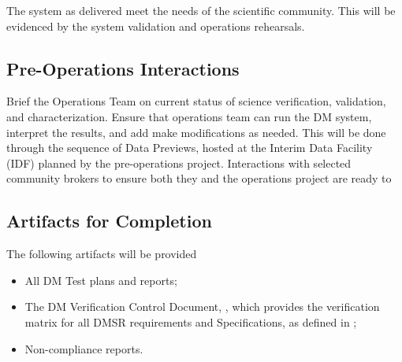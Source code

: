 The system as delivered meet the needs of the scientific community. 
This will be evidenced by the system validation and operations rehearsals. 

\subsection{Pre-Operations Interactions}

Brief the Operations Team on current status of science verification, validation, and characterization.
Ensure that operations team can run the DM system, interpret the results, and add make modifications as needed. 
This will be done through the sequence of Data Previews,  hosted at the Interim Data Facility (IDF) planned by the pre-operations project. 
Interactions with selected community brokers to ensure both they and the operations project are ready to 

\subsection{Artifacts for Completion}

The following artifacts will be provided 
\begin{itemize}
\item All DM Test plans and reports;
\item The DM Verification Control Document, , which provides the verification matrix for all DMSR requirements and Specifications, as defined in ;
\item Non-compliance reports.
\end{itemize}